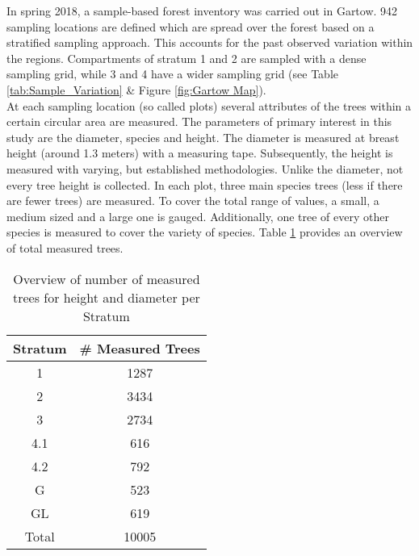 
In spring 2018, a sample-based forest inventory was carried out in Gartow. 942 sampling locations are defined which are spread over the forest based on a stratified sampling approach. This accounts for the past observed variation within the regions. Compartments of stratum 1 and 2 are sampled with a dense sampling grid, while 3 and 4 have a wider sampling grid (see Table \ref{tab:Sample_Variation} \& Figure \ref{fig:Gartow Map}).\\

At each sampling location (so called plots) several attributes of the trees within a certain circular area are measured. The parameters of primary interest in this study are the diameter, species and height. The diameter is measured at breast height (around 1.3 meters) with a measuring tape. Subsequently, the height is measured with varying, but established methodologies. Unlike the diameter, not every tree height is collected. In each plot, three main species trees (less if there are fewer trees) are measured. To cover the total range of values, a small, a medium sized and a large one is gauged. Additionally, one tree of every other species is measured to cover the variety of species. Table \ref{tab:Measured Trees} provides an overview of total measured trees.

\begin{table}[H]
\setlength\arrayrulewidth{1pt}  
\centering
\begin{tabular}{|c| c|}
\hline 
\rowcolor{Gray}
\textbf{Stratum} & \textbf{\# Measured Trees} \\ 
\hline 
1 & 1287 \\ 
\hline 
2 & 3434 \\ 
\hline 
3 & 2734 \\ 
\hline 
4.1 & 616 \\ 
\hline 
4.2 & 792 \\ 	
\hline 
G & 523 \\ 
\hline 
GL & 619 \\ 
\hline 
\rowcolor{SeaBlue}
Total & 10005 \\ 
\hline 
\end{tabular} 
\caption{Overview of number of measured trees for height and diameter per Stratum}
\label{tab:Measured Trees}
\end{table}

